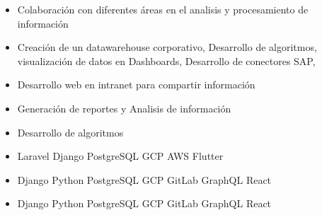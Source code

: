 \documentclass[10pt,a4paper,ragged2e,withhyper]{altacv}
\begin{document}
\begin{paracol}{2}

\begin{itemize}
\item Colaboración con diferentes áreas en el analisis y procesamiento de información
\item Creación de un datawarehouse corporativo, Desarrollo de algoritmos, visualización de datos en Dashboards, Desarrollo de conectores SAP, 
\item Desarrollo web en intranet para compartir información
\end{itemize}

\divider

\begin{itemize}
\item Generación de reportes y Analisis de información
\item Desarrollo de algoritmos
\end{itemize}


\begin{itemize}
	\item Laravel Django PostgreSQL GCP AWS Flutter
\end{itemize}

\divider

\begin{itemize}
	\item Django Python PostgreSQL GCP GitLab GraphQL React
\end{itemize}

\divider

\begin{itemize}
\item Django Python PostgreSQL GCP GitLab GraphQL React
\end{itemize}


\end{paracol}
\end{document}
